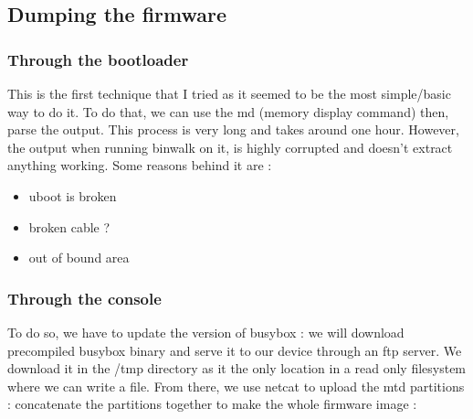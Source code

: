 \documentclass{article}
\begin{document}
\subsection{Dumping the firmware}
\subsubsection{Through the bootloader}
This is the first technique that I tried as it seemed to be the most simple/basic way to do it. To do that, we can use the md (memory display command) then, parse the output. This process is very long and takes around one hour. However, the output when running binwalk on it, is highly corrupted and doesn't extract anything working. Some reasons behind it are :
\begin{itemize}
	\item uboot is broken
	\item broken cable ?
	\item out of bound area
\end{itemize}
\subsubsection{Through the console}
To do so, we have to update the version of busybox : we will download precompiled busybox binary and serve it to our device through an ftp server. We download it in the /tmp directory as it the only location in a read only filesystem where we can write a file. From there, we use netcat to upload the mtd partitions : concatenate the partitions together to make the whole firmware image :
\end{document}
